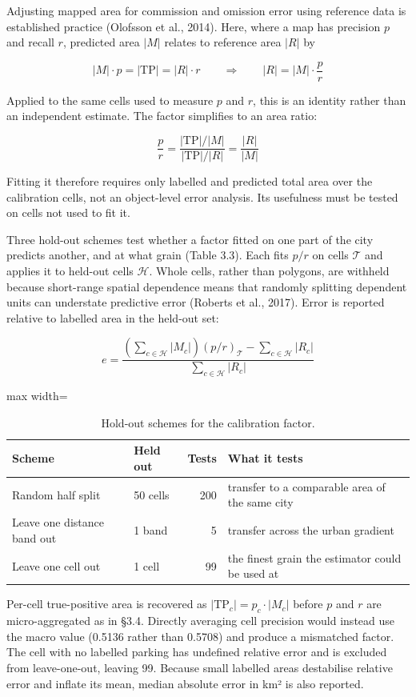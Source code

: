Adjusting mapped area for commission and omission error using reference data is established practice (Olofsson et al., 2014). Here, where a map has precision \(p\) and recall \(r\), predicted area \(|M|\) relates to reference area \(|R|\) by

\[
|M| \cdot p = |\mathrm{TP}| = |R| \cdot r
\qquad\Longrightarrow\qquad
|R| = |M| \cdot \frac{p}{r}
\]

Applied to the same cells used to measure \(p\) and \(r\), this is an identity rather than an independent estimate. The factor simplifies to an area ratio:

\[
\frac{p}{r} = \frac{|\mathrm{TP}|/|M|}{|\mathrm{TP}|/|R|} = \frac{|R|}{|M|}
\]

Fitting it therefore requires only labelled and predicted total area over the calibration cells, not an object-level error analysis. Its usefulness must be tested on cells not used to fit it.

Three hold-out schemes test whether a factor fitted on one part of the city predicts another, and at what grain (Table 3.3). Each fits \(p/r\) on cells \(\mathcal{T}\) and applies it to held-out cells \(\mathcal{H}\). Whole cells, rather than polygons, are withheld because short-range spatial dependence means that randomly splitting dependent units can understate predictive error (Roberts et al., 2017). Error is reported relative to labelled area in the held-out set:

\[
e = \frac{\left(\sum_{c \in \mathcal{H}} |M_c|\right)\left(p/r\right)_{\mathcal{T}} - \sum_{c \in \mathcal{H}} |R_c|}{\sum_{c \in \mathcal{H}} |R_c|}
\]

\begin{table}[htbp]
\centering
\caption{Hold-out schemes for the calibration factor.}\label{tab:3.3}
\begin{adjustbox}{max width=\textwidth}
\begin{tabular}{@{}llrl@{}}
\toprule
Scheme & Held out & Tests & What it tests \\
\midrule
Random half split & 50 cells & 200 & transfer to a comparable area of the same city \\
Leave one distance band out & 1 band & 5 & transfer across the urban gradient \\
Leave one cell out & 1 cell & 99 & the finest grain the estimator could be used at \\
\bottomrule
\end{tabular}
\end{adjustbox}
\end{table}
\restoreparskip

Per-cell true-positive area is recovered as \(|\mathrm{TP}_c| = p_c \cdot |M_c|\) before \(p\) and \(r\) are micro-aggregated as in §3.4. Directly averaging cell precision would instead use the macro value (0.5136 rather than 0.5708) and produce a mismatched factor. The cell with no labelled parking has undefined relative error and is excluded from leave-one-out, leaving 99. Because small labelled areas destabilise relative error and inflate its mean, median absolute error in km² is also reported.
